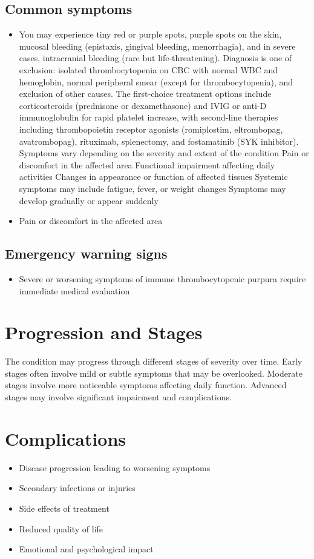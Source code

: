 \subsection{Common symptoms}
\begin{itemize}[noitemsep]
  \item You may experience tiny red or purple spots, purple spots on the skin, mucosal bleeding (epistaxis, gingival bleeding, menorrhagia), and in severe cases, intracranial bleeding (rare but life-threatening). Diagnosis is one of exclusion: isolated thrombocytopenia on CBC with normal WBC and hemoglobin, normal peripheral smear (except for thrombocytopenia), and exclusion of other causes. The first-choice treatment options include corticosteroids (prednisone or dexamethasone) and IVIG or anti-D immunoglobulin for rapid platelet increase, with second-line therapies including thrombopoietin receptor agonists (romiplostim, eltrombopag, avatrombopag), rituximab, splenectomy, and fostamatinib (SYK inhibitor). Symptoms vary depending on the severity and extent of the condition Pain or discomfort in the affected area Functional impairment affecting daily activities Changes in appearance or function of affected tissues Systemic symptoms may include fatigue, fever, or weight changes Symptoms may develop gradually or appear suddenly
  \item Pain or discomfort in the affected area
  \end{itemize}

\subsection{Emergency warning signs}
\begin{itemize}[noitemsep]
  \item Severe or worsening symptoms of immune thrombocytopenic purpura require immediate medical evaluation
\end{itemize}
\section{Progression and Stages}
The condition may progress through different stages of severity over time. Early stages often involve mild or subtle symptoms that may be overlooked. Moderate stages involve more noticeable symptoms affecting daily function. Advanced stages may involve significant impairment and complications.
\section{Complications}
\begin{itemize}[noitemsep]
  \item Disease progression leading to worsening symptoms
  \item Secondary infections or injuries
  \item Side effects of treatment
  \item Reduced quality of life
  \item Emotional and psychological impact
\end{itemize}
